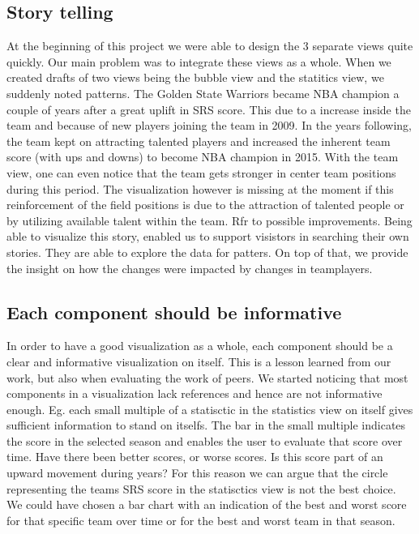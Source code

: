 \documentclass{sigchi}
\begin{document}
\subsection{Story telling}
At the beginning of this project we were able to design the 3 separate views 
quite quickly. Our main problem was to integrate these views as a whole. When we created drafts of two views being the bubble view and the statitics view, we suddenly noted patterns. The Golden State Warriors became NBA champion a couple of years after a great uplift in SRS score. This due to a increase inside the team and because of new players joining the team in 2009. In 
the years following, the team kept on attracting talented players and increased the inherent team score (with ups and downs) to become NBA champion in 2015. With the team view, one can even notice that the team gets stronger in center team positions during this period. The visualization however is missing at the moment if this reinforcement of the field positions
is due to the attraction of talented people or by utilizing available talent within the team. Rfr to possible improvements. Being able to visualize this story, enabled us to support visistors in searching their own stories. They are able to explore the data for patters. On top of that, we provide the insight on how the changes were impacted by changes in teamplayers.

\subsection{Each component should be informative}
In order to have a good visualization as a whole, each component should be a clear and 
informative visualization on itself. This is a lesson learned from our work, but also when
evaluating the work of peers. We started noticing that most components in a visualization 
lack references and hence are not informative enough. Eg. each small multiple of a statisctic
in the statistics view on itself gives sufficient information to stand on itselfs. The bar in
the small multiple indicates the score in the selected season and enables the user to evaluate
that score over time. Have there been better scores, or worse scores. Is this score part of 
an upward movement during years? 
For this reason we can argue that the circle representing the teams SRS score in the statisctics
view is not the best choice. We could have chosen a bar chart with an indication of the best and
worst score for that specific team over time or for the best and worst team in that season.
\end{document}
